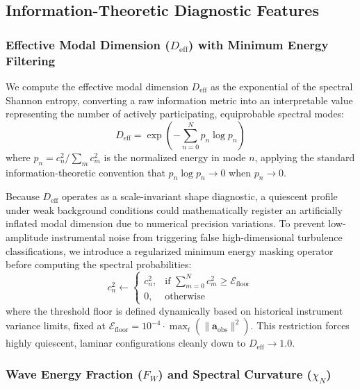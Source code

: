 \subsection{Information-Theoretic Diagnostic Features}
\label{sec:methods:diagnostics}

\subsubsection{Effective Modal Dimension ($D_{\mathrm{eff}}$) with Minimum Energy Filtering}

We compute the effective modal dimension $D_{\mathrm{eff}}$ as the exponential of the spectral Shannon entropy, converting a raw information metric into an interpretable value representing the number of actively participating, equiprobable spectral modes:
\begin{equation}
D_{\mathrm{eff}} = \exp\left( -\sum_{n=0}^{N} p_n \log p_n \right)
\label{eq:d_eff_def}
\end{equation}
where $p_n = c_n^2 / \sum_m c_m^2$ is the normalized energy in mode $n$, applying the standard information-theoretic convention that $p_n \log p_n \to 0$ when $p_n \to 0$.

Because $D_{\mathrm{eff}}$ operates as a scale-invariant shape diagnostic, a quiescent profile under weak background conditions could mathematically register an artificially inflated modal dimension due to numerical precision variations. To prevent low-amplitude instrumental noise from triggering false high-dimensional turbulence classifications, we introduce a regularized minimum energy masking operator before computing the spectral probabilities:
\begin{equation}
c_n^2 \leftarrow \begin{cases}
c_n^2, & \text{if } \sum_{m=0}^{N} c_m^2 \ge \mathcal{E}_{\text{floor}} \\
0, & \text{otherwise}
\end{cases}
\label{eq:energy_floor}
\end{equation}
where the threshold floor is defined dynamically based on historical instrument variance limits, fixed at $\mathcal{E}_{\text{floor}} = 10^{-4} \cdot \max_{t} \left(\|\mathbf{a}_{\mathrm{obs}}\|^2\right)$. This restriction forces highly quiescent, laminar configurations cleanly down to $D_{\mathrm{eff}} \to 1.0$.

\subsubsection{Wave Energy Fraction ($F_W$) and Spectral Curvature ($\chi_N$)}

